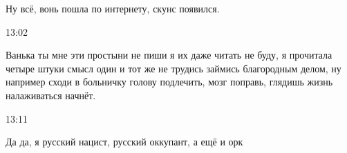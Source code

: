 Ну всё, вонь пошла по интернету, скунс появился.

13:02

Ванька ты мне эти простыни не пиши я их даже читать не буду, я прочитала четыре
штуки смысл один и тот же не трудись займись благородным делом, ну например
сходи в больничку голову подлечить, мозг поправь, глядишь жизнь налаживаться
начнёт.

13:11

Да да, я русский нацист, русский оккупант, а ещё и орк🤣
